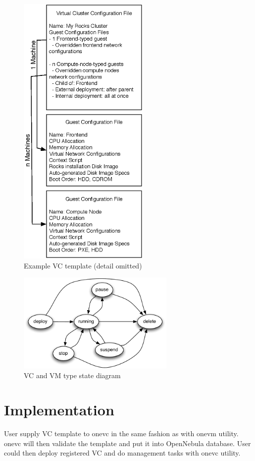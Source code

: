 \documentclass[conference]{IEEEtran}
\begin{document}
\begin{figure}[!t]
\centering
\includegraphics[width=2.5in]{template}
\caption{Example VC template (detail omitted)}
\label{fig:template}
\end{figure}

\begin{figure}[!t]
\centering
\includegraphics[width=3in]{state}
\caption{VC and VM type state diagram}
\label{fig:state}
\end{figure}

\section{Implementation}
User supply VC template to onevc in the same fashion as with onevm utility. onevc will then validate the template and put it into OpenNebula database. User could then deploy registered VC and do management tasks with onevc utility.
\end{document}
